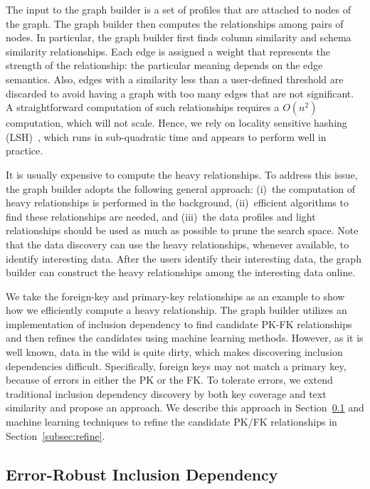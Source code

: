 The input to the graph builder is a set of profiles that are attached to nodes
of the graph.  The graph builder then computes the relationships among pairs of
nodes. In particular, the graph builder first finds column similarity and
schema similarity relationships.  Each edge is assigned a weight that represents
the strength of the relationship: the particular meaning depends on the edge
semantics.  Also, edges with a similarity less than a user-defined threshold are
discarded to avoid having a graph with too many edges that are not significant.
A straightforward computation of such relationships requires a $O(n^2)$
computation, which will not scale.  Hence, we rely on locality sensitive hashing
(LSH)~\cite{DBLP:conf/compgeom/DatarIIM04}, which runs in sub-quadratic time
and appears to perform well in practice.

It is usually expensive to compute the heavy relationships. To address this
issue, the graph builder adopts the following general approach: 
(i)~the computation of heavy relationships is performed in the background, 
(ii)~efficient algorithms to find these relationships are needed, 
and (iii)~the data profiles and light relationships should be used as much as possible to prune the search space. 
Note that the data discovery can use the heavy
relationships, whenever available, to identify interesting data. After the
users identify their interesting data, the graph builder can construct the heavy
relationships among the interesting data online.

We take the foreign-key and primary-key relationships as an example to show how
we efficiently compute a heavy relationship. The graph builder utilizes an
implementation of inclusion dependency to find candidate PK-FK relationships and
then refines the candidates using machine learning methods. However,
as it is well known, data in the wild is quite dirty, which makes discovering
inclusion dependencies difficult. Specifically, foreign keys may not match a
primary key, because of errors in either the PK or the FK. To tolerate errors,
we extend traditional inclusion dependency discovery by both key coverage and
text similarity and propose an \emph{\eind} approach. 
We describe this approach in Section~\ref{subsec:eind} and machine learning
techniques to refine the candidate PK/FK relationships in Section~\ref{subsec:refine}.

\subsection{Error-Robust Inclusion Dependency}\label{subsec:eind}


